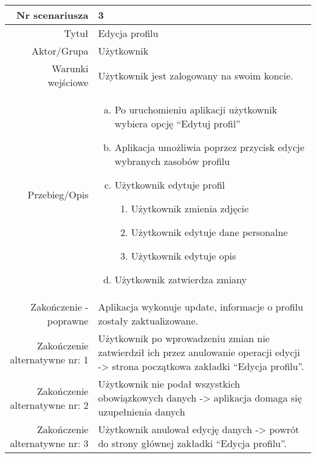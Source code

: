 \documentclass[12pt,a4paper]{article}
\begin{document}
\begin{tabular}{|r|l|} \hline
Nr scenariusza & 3 \\
\hline
Tytuł & Edycja profilu  \\
\hline
Aktor/Grupa & Użytkownik \\
\hline
Warunki wejściowe & Użytkownik jest zalogowany na swoim koncie. \\
\hline
Przebieg/Opis & 
\begin{enumerate}[a)]
\item Po uruchomieniu aplikacji użytkownik wybiera opcję “Edytuj profil”
\item Aplikacja umożliwia poprzez przycisk edycje wybranych zasobów profilu
\item Użytkownik edytuje profil 
\begin{enumerate}
    \item Użytkownik zmienia zdjęcie
    \item Użytkownik edytuje dane personalne  
    \item Użytkownik edytuje opis 
  \end{enumerate}
\item Użytkownik zatwierdza zmiany 
\end{enumerate}
\\
\hline
Zakończenie - poprawne & Aplikacja wykonuje update, informacje o profilu zostały zaktualizowane.  
\\ 
\hline
Zakończenie alternatywne nr: 1 & Użytkownik po wprowadzeniu zmian nie zatwierdził ich przez anulowanie operacji edycji  -> strona początkowa zakładki “Edycja profilu”.
\\
\hline
Zakończenie alternatywne nr: 2 & Użytkownik nie podał wszystkich obowiązkowych danych -> aplikacja domaga się uzupełnienia danych
\\
\hline
Zakończenie alternatywne nr: 3 & Użytkownik anulował edycję danych  -> powrót do strony głównej zakładki “Edycja profilu”. 
\\
\hline
\end{tabular}
\end{document}
